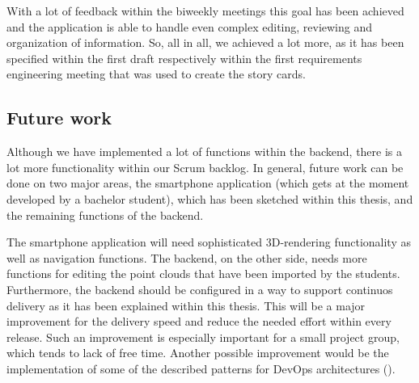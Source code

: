 With a lot of feedback within the biweekly meetings this goal has been achieved and the application is able to handle even complex editing, reviewing and organization of information. So, all in all, we achieved a lot more, as it has been specified within the first draft respectively within the first requirements engineering meeting that was used to create the story cards.

\subsection{Future work}
\label{futurework}
Although we have implemented a lot of functions within the backend, there is a lot more functionality within our Scrum backlog. In general, future work can be done on two major areas, the smartphone application (which gets at the moment developed by a bachelor student), which has been sketched within this thesis,  and the remaining functions of the backend. 

The smartphone application will need sophisticated 3D-rendering functionality as well as navigation functions. The backend, on the other side, needs more functions for editing the point clouds that have been imported by the students. Furthermore, the backend should be configured in a way to support continuos delivery as it has been explained within this thesis. This will be a major improvement for the delivery speed and reduce the needed effort within every release. Such an improvement is especially important for a small project group, which tends to lack of free time. Another possible improvement would be the implementation of some of the described patterns for DevOps architectures (\cite{cukier2013devops}).  

